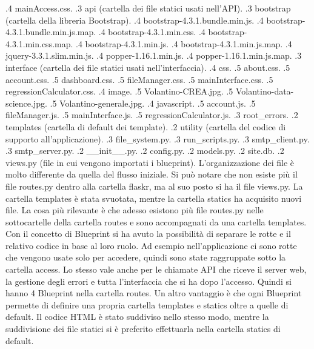 {.4 mainAccess.css.
.3 api \hspace{10mm} (cartella dei file statici usati nell'API).
.3 bootstrap \hspace{10mm} (cartella della libreria Bootstrap).
.4 bootstrap-4.3.1.bundle.min.js.
.4 bootstrap-4.3.1.bundle.min.js.map.
.4 bootstrap-4.3.1.min.css.
.4 bootstrap-4.3.1.min.css.map.
.4 bootstrap-4.3.1.min.js.
.4 bootstrap-4.3.1.min.js.map.
.4 jquery-3.3.1.slim.min.js.
.4 popper-1.16.1.min.js.
.4 popper-1.16.1.min.js.map.
.3 interface \hspace{10mm} (cartella dei file statici usati nell'interfaccia).
.4 css.
.5 about.css.
.5 account.css.
.5 dashboard.css.
.5 fileManager.css.
.5 mainInterface.css.
.5 regressionCalculator.css.
.4 image.
.5 Volantino-CREA.jpg.
.5 Volantino-data-science.jpg.
.5 Volantino-generale.jpg.
.4 javascript.
.5 account.js.
.5 fileManager.js.
.5 mainInterface.js.
.5 regressionCalculator.js.
.3 root\_errors.
.2 templates \hspace{10mm} (cartella di default dei template).
.2 utility \hspace{10mm} (cartella del codice di supporto all'applicazione).
.3 file\_system.py.
.3 run\_scripts.py.
.3 smtp\_client.py.
.3 smtp\_server.py.
.2 \_\_init\_\_.py.
.2 config.py.
.2 models.py.
.2 site.db.
.2 views.py \hspace{10mm} (file in cui vengono importati i blueprint).
}  
\phantom{spazio}\newline
L'organizzazione dei file è molto differente da quella del flusso iniziale.
Si può notare che non esiste più il file routes.py dentro alla cartella flaskr,
ma al suo posto si ha il file views.py.
La cartella templates è stata svuotata, mentre la cartella statics ha acquisito nuovi file.
La cosa più rilevante è che adesso esistono più file routes.py nelle sottocartelle della cartella routes
e sono accompagnati da una cartella templates.
Con il concetto di Blueprint si ha avuto la possibilità di separare le rotte e il relativo codice
in base al loro ruolo.
Ad esempio nell'applicazione ci sono rotte che vengono usate solo per accedere, 
quindi sono state raggruppate sotto la cartella access.
Lo stesso vale anche per le chiamate API che riceve il server web, la gestione degli errori 
e tutta l'interfaccia che si ha dopo l'accesso.
Quindi si hanno 4 Blueprint nella cartella routes.
Un altro vantaggio è che ogni Blueprint permette di definire una propria cartella templates e statics 
oltre a quelle di default.
Il codice HTML è stato suddiviso nello stesso modo, 
mentre la suddivisione dei file statici si è preferito effettuarla nella cartella statics di default.
